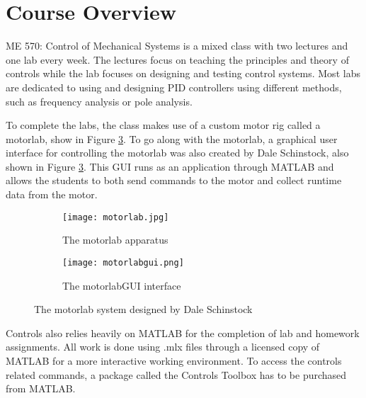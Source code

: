 \section{Course Overview}

ME 570: Control of Mechanical Systems is a mixed class with two lectures and one lab every week. The lectures focus on teaching
the principles and theory of controls while the lab focuses on designing and testing control systems. Most labs are dedicated to
using and designing PID controllers using different methods, such as frequency analysis or pole analysis.

To complete the labs, the class makes use of a custom motor rig called a motorlab, show in Figure \ref{fig:motorlab}. To go 
along with the motorlab, a graphical user interface for controlling the motorlab was also created by Dale Schinstock, also 
shown in Figure \ref{fig:motorlab}. This GUI runs as an application through MATLAB and allows the students to both send 
commands to the motor and collect runtime data from the motor.


\begin{figure}
    \centering
    \begin{subfigure}{.5\textwidth}
      \centering
      \texttt{[image: motorlab.jpg]}
      \caption{The motorlab apparatus}
      \label{fig:motorlab-device}
    \end{subfigure}%
    \begin{subfigure}{.5\textwidth}
      \centering
      \texttt{[image: motorlabgui.png]}
      \caption{The motorlabGUI interface}
      \label{fig:motorlabgui}
    \end{subfigure}
    \caption{The motorlab system designed by Dale Schinstock}
    \label{fig:motorlab}
\end{figure}

Controls also relies heavily on MATLAB for the completion of lab and homework assignments. All work is done using .mlx files through a 
licensed copy of MATLAB for a more interactive working environment. To access the controls related commands, a package called 
the Controls Toolbox has to be purchased from MATLAB. 

